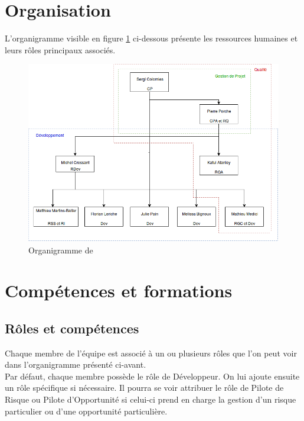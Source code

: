 \section{Organisation} \label{Organisation}

L'organigramme visible en figure \ref{organigramme} ci-dessous présente les ressources humaines et leurs rôles principaux associés.

\begin{figure}[H]
   \centering
   \includegraphics[width=15cm]{images/organigramme.png}
   \caption{\label{organigramme} Organigramme de \nomEquipe}
\end{figure}

\section{Compétences et formations} \label{CompetencesEtFormations}
\subsection{Rôles et compétences} \label{RolesEtCompetences}

\indent Chaque membre de l'équipe \nomEquipe{} est associé à un ou plusieurs rôles que l’on peut voir dans l’organigramme présenté ci-avant.\\

\indent Par défaut, chaque membre possède le rôle de Développeur. On lui ajoute ensuite un rôle spécifique si nécessaire. Il pourra se voir attribuer le rôle de Pilote de Risque ou Pilote d'Opportunité si celui-ci prend en charge la gestion d’un risque particulier ou d'une opportunité particulière.\\ 

